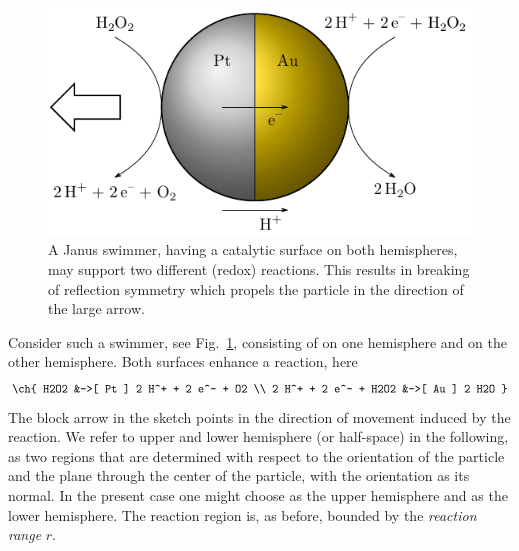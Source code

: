 \documentclass[aip,jcp,reprint,a4paper,onecolumn,nofootinbib,amsmath,amssymb]{revtex4-1}
\begin{document}
\begin{figure}
  \centering
  \includegraphics{FIGURES/janus-particle}
  \caption{\label{fig:janus}A Janus swimmer, having a catalytic surface on both hemispheres, may support two different (redox) reactions. This results in breaking of reflection symmetry which propels the particle in the direction of the large arrow.}
\end{figure}

Consider such a swimmer, see Fig.~\ref{fig:janus}, consisting of  on one hemisphere and  on the other hemisphere. Both surfaces enhance a reaction, here~\cite{Gibbs_10,Wheat_10}
\begin{align}
  \label{eq:H2O2}
  \ch{
    H2O2 &->[ Pt ] 2 H^+ + 2 e^- + O2 \\
    2 H^+ + 2 e^- + H2O2 &->[ Au ] 2 H2O
  }
\end{align}
The block arrow in the sketch points in the direction of movement induced by the reaction. We refer to upper and lower hemisphere (or half-space) in the following, as two regions that are determined with respect to the orientation of the particle and the plane through the center of the particle, with the orientation as its normal. In the present case one might choose  as the upper hemisphere and  as the lower hemisphere. The reaction region is, as before, bounded by the \emph{reaction range} $r$.
\end{document}
